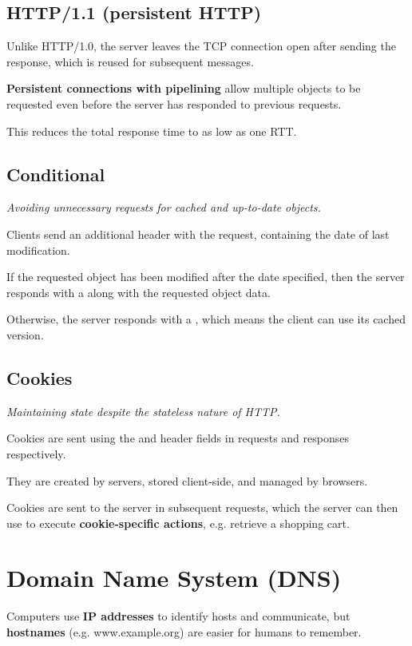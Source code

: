 \subsection{HTTP/1.1 (persistent HTTP)}
Unlike HTTP/1.0, the server leaves the TCP connection open after sending the response, which is reused for subsequent messages.

\textbf{Persistent connections with pipelining} allow multiple objects to be requested even before the server
has responded to previous requests.

This reduces the total response time to as low as one RTT.

\subsection{Conditional }
\emph{Avoiding unnecessary requests for cached and up-to-date objects.}

Clients send an additional  header with the request, containing the date of last modification.

If the requested object has been modified after the date specified, then the server responds with a  along
with the requested object data.

Otherwise, the server responds with a , which means the client can use its cached version.

\subsection{Cookies}
\emph{Maintaining state despite the stateless nature of HTTP.}

Cookies are sent using the  and  header fields in requests and responses respectively.

They are created by servers, stored client-side, and managed by browsers.

Cookies are sent to the server in subsequent requests,
which the server can then use to execute \textbf{cookie-specific actions}, e.g. retrieve a shopping cart.


\section{Domain Name System (DNS)}
Computers use \textbf{IP addresses} to identify hosts and communicate, 
but \textbf{hostnames} (e.g. www.example.org) are easier for humans to remember.

